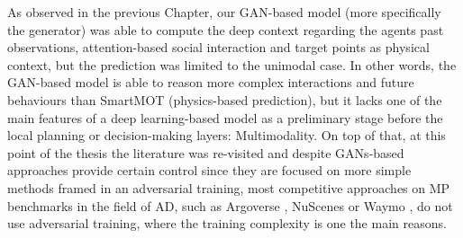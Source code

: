 As observed in the previous Chapter, our \ac{GAN}-based model (more specifically the generator) was able to compute the deep context regarding the agents past observations, attention-based social interaction and target points as physical context, but the prediction was limited to the unimodal case. In other words, the \ac{GAN}-based model is able to reason more complex interactions and future behaviours than SmartMOT (physics-based prediction), but it lacks one of the main features of a deep learning-based model as a preliminary stage before the local planning or decision-making layers: Multimodality. On top of that, at this point of the thesis the literature was re-visited and despite \acp{GAN}-based approaches \cite{sadeghian2019sophie, dendorfer2020goal, gupta2018social, gomez2022exploring} provide certain control since they are focused on more simple methods framed in an adversarial training, most competitive approaches on \ac{MP} benchmarks in the field of \ac{AD}, such as Argoverse \cite{chang2019argoverse}, NuScenes \cite{caesar2020nuscenes} or Waymo \cite{ettinger2021large}, do not use adversarial training, where the training complexity is one the main reasons.

\begin{comment}
In this paper, following the same principles as recent SOTA methods, we aim to achieve competitive results that ensure reliable predictions, as observed in Fig.~\ref{fig:results_teaser}, yet, using \textbf{light-weight} attention-based models that take as input the past trajectories of each agent, and integrate prior-knowledge about the map easily. The main contributions of our work are as following: 

\begin{itemize}
	\item (1) Identify a key problem in the size of motion prediction models, with implications in real-time inference and edge-device deployment.
	\item (2) Propose several efficient baselines for vehicle motion prediction that do not explicitly rely on an exhaustive analysis of the context HD map (either vectorized or rasterized), but on prior map information obtained in a simple preprocessing step, that serves as a guide in the prediction.
	\item (3) Use fewer parameters and operations (FLOPs) than other SOTA models to achieve competitive performance on Argoverse 1.0~\cite{chang2019argoverse} with lower computational cost.
\end{itemize} 
\end{comment}


